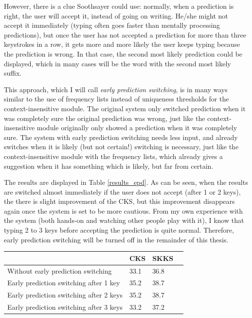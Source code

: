 \documentclass[11pt]{article}
\let\originaltable\table
\let\endoriginaltable\endtable
\renewenvironment{table}[1][ht]{%
  \originaltable[#1]
  \centering}%
  {\endoriginaltable}
\begin{document}
However, there is a clue Soothsayer could use: normally, when a prediction is right, the user will accept it, instead of going on writing. He/she might not accept it immediately (typing often goes faster than mentally processing predictions), but once the user has not accepted a prediction for more than three keystrokes in a row, it gets more and more likely the user keeps typing because the prediction is wrong. In that case, the second most likely prediction could be displayed, which in many cases will be the word with the second most likely suffix.

This approach, which I will call \emph{early prediction switching}, is in many ways similar to the use of frequency lists instead of uniqueness thresholds for the context-insensitive module. The original system only switched prediction when it was completely sure the original prediction was wrong, just like the context-insensitive module originally only showed a prediction when it was completely sure. The system with early prediction switching needs less input, and already switches when it is likely (but not certain!) switching is necessary, just like the context-insensitive module with the frequency lists, which already gives a suggestion when it has something which is likely, but far from certain.

The results are displayed in Table \ref{results_epd}. As can be seen, when the results are switched almost immediately if the user does not accept (after 1 or 2 keys), the there is slight improvement of the CKS, but this improvement disappears again once the system is set to be more cautious. From my own experience with the system (both hands-on and watching other people play with it), I know that typing 2 to 3 keys before accepting the prediction is quite normal. Therefore, early prediction switching will be turned off in the remainder of this thesis.

\begin{table}[h]
\begin{tabular}{l|lll} 

&CKS&SKKS\\
\hline
Without early prediction switching&33.1&36.8\\
Early prediction switching after 1 key&35.2&38.7\\
Early prediction switching after 2 keys&35.2&38.7\\
Early prediction switching after 3 keys&33.2&37.2\\
\end{tabular} 
\caption{Percentage of keystrokes saved with and without early prediction switching.} \label{results_epd}
\end{table}
\end{document}
